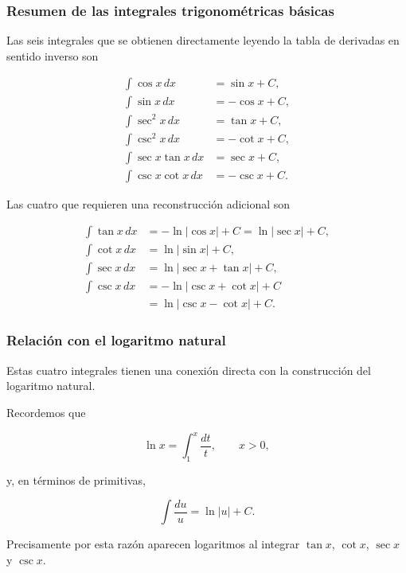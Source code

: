 \documentclass[12pt]{article}
\theoremstyle{definition}
\theoremstyle{remark}
\begin{document}
\subsubsection*{Resumen de las integrales trigonométricas básicas}

Las seis integrales que se obtienen directamente leyendo la tabla
de derivadas en sentido inverso son

\[
\boxed{
\begin{aligned}
\int\cos x\,dx
&=\sin x+C,\\
\int\sin x\,dx
&=-\cos x+C,\\
\int\sec^2x\,dx
&=\tan x+C,\\
\int\csc^2x\,dx
&=-\cot x+C,\\
\int\sec x\tan x\,dx
&=\sec x+C,\\
\int\csc x\cot x\,dx
&=-\csc x+C.
\end{aligned}}
\]

Las cuatro que requieren una reconstrucción adicional son

\[
\boxed{
\begin{aligned}
\int\tan x\,dx
&=-\ln|\cos x|+C
 =\ln|\sec x|+C,\\[2mm]
\int\cot x\,dx
&=\ln|\sin x|+C,\\[2mm]
\int\sec x\,dx
&=\ln|\sec x+\tan x|+C,\\[2mm]
\int\csc x\,dx
&=-\ln|\csc x+\cot x|+C\\
&=\ln|\csc x-\cot x|+C.
\end{aligned}}
\]

\subsubsection*{Relación con el logaritmo natural}

Estas cuatro integrales tienen una conexión directa con la
construcción del logaritmo natural.

Recordemos que

\[
\ln x
=
\int_1^x\frac{dt}{t},
\qquad x>0,
\]

y, en términos de primitivas,

\[
\int\frac{du}{u}
=
\ln|u|+C.
\]

Precisamente por esta razón aparecen logaritmos al integrar
\(\tan x\), \(\cot x\), \(\sec x\) y \(\csc x\).
\end{document}
